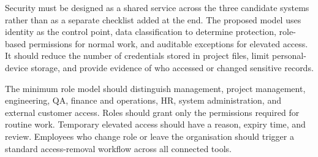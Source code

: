 \documentclass[12pt,a4paper]{report}
\begin{document}
Security must be designed as a shared service across the three candidate systems rather than as a
separate checklist added at the end. The proposed model uses identity as the control point, data
classification to determine protection, role-based permissions for normal work, and auditable
exceptions for elevated access. It should reduce the number of credentials stored in project files,
limit personal-device storage, and provide evidence of who accessed or changed sensitive records.

The minimum role model should distinguish management, project management, engineering, QA,
finance and operations, HR, system administration, and external customer access. Roles should grant
only the permissions required for routine work. Temporary elevated access should have a reason,
expiry time, and review. Employees who change role or leave the organisation should trigger a
standard access-removal workflow across all connected tools.
\end{document}
